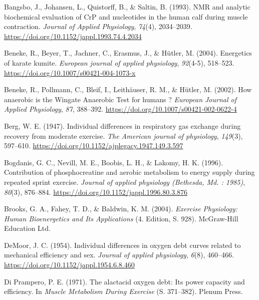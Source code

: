 \documentclass[
  letterpaper,
  DIV=11]{scrartcl}
\newlength{\cslhangindent}
\newenvironment{CSLReferences}[2] %
 {\begin{list}{}{%
  \setlength{\itemindent}{0pt}
  \setlength{\leftmargin}{0pt}
  \setlength{\parsep}{0pt}
  \ifodd #1
   \setlength{\leftmargin}{\cslhangindent}
   \setlength{\itemindent}{-1\cslhangindent}
  \fi
  \setlength{\itemsep}{#2\baselineskip}}}
 {\end{list}}
\begin{document}
\label{refs}
\begin{CSLReferences}{1}{0}
Bangsbo, J., Johansen, L., Quistorff, B., \& Saltin, B. (1993). {NMR and
analytic biochemical evaluation of CrP and nucleotides in the human calf
during muscle contraction}. \emph{Journal of Applied Physiology},
\emph{74}(4), 2034--2039.
\url{https://doi.org/10.1152/jappl.1993.74.4.2034}

Beneke, R., Beyer, T., Jachner, C., Erasmus, J., \& Hütler, M. (2004).
{Energetics of karate kumite.} \emph{European journal of applied
physiology}, \emph{92}(4-5), 518--523.
\url{https://doi.org/10.1007/s00421-004-1073-x}

Beneke, R., Pollmann, C., Bleif, I., Leithäuser, R. M., \& Hütler, M.
(2002). {How anaerobic is the Wingate Anaerobic Test for humans ?}
\emph{European Journal of Applied Physiology}, \emph{87}, 388--392.
\url{https://doi.org/10.1007/s00421-002-0622-4}

Berg, W. E. (1947). {Individual differences in respiratory gas exchange
during recovery from moderate exercise.} \emph{The American journal of
physiology}, \emph{149}(3), 597--610.
\url{https://doi.org/10.1152/ajplegacy.1947.149.3.597}

Bogdanis, G. C., Nevill, M. E., Boobis, L. H., \& Lakomy, H. K. (1996).
{Contribution of phosphocreatine and aerobic metabolism to energy supply
during repeated sprint exercise.} \emph{Journal of applied physiology
(Bethesda, Md. : 1985)}, \emph{80}(3), 876--884.
\url{https://doi.org/10.1152/jappl.1996.80.3.876}

Brooks, G. A., Fahey, T. D., \& Baldwin, K. M. (2004). \emph{{Exercise
Physiology: Human Bioenergetics and Its Applications}} (4. Edition, S.
928). McGraw-Hill Education Ltd.

DeMoor, J. C. (1954). {Individual differences in oxygen debt curves
related to mechanical efficiency and sex.} \emph{Journal of applied
physiology}, \emph{6}(8), 460--466.
\url{https://doi.org/10.1152/jappl.1954.6.8.460}

Di Prampero, P. E. (1971). {The alactacid oxygen debt: Its power
capacity and efficiency}. In \emph{Muscle Metabolism During Exercise}
(S. 371--382). Plenum Press.


\end{CSLReferences}
\end{document}
